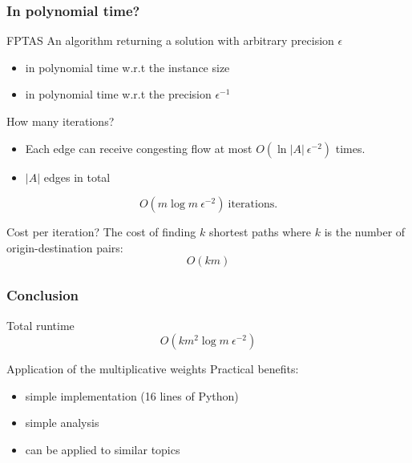 \documentclass{beamer}
\begin{document}
\begin{frame}
    \frametitle{In polynomial time?}

    \begin{block}{FPTAS}
        An algorithm returning a solution with arbitrary precision $\epsilon$
        \begin{itemize}
            \item in polynomial time w.r.t the instance size
            \item in polynomial time w.r.t the precision $\epsilon^{-1}$
        \end{itemize}
    \end{block}

    \begin{block}{How many iterations?}
        \begin{itemize}
            \item Each edge can receive congesting flow at most
                $O(\ln|A|~\epsilon^{-2})$ times.
            \item $|A|$ edges in total
        \end{itemize}
        \begin{equation*}
        O(m\log m~\epsilon^{-2})~\text{iterations.}
        \end{equation*}
    \end{block}

    \begin{block}{Cost per iteration?}
        The cost of finding $k$ shortest paths where $k$ is the number of
        origin-destination pairs:
        \begin{equation*}
            O(km)
        \end{equation*}
    \end{block}


\end{frame}

\begin{frame}
    \frametitle{Conclusion}

    \begin{block}{Total runtime}
    \begin{equation*}
    O(km^2\log m~\epsilon^{-2})
    \end{equation*}
    \end{block}

    \begin{block}{Application of the multiplicative weights}
        Practical benefits:
        \begin{itemize}
            \item simple implementation (16 lines of Python)
            \item simple analysis
            \item can be applied to similar topics
        \end{itemize}
    \end{block}

\end{frame}
\end{document}
